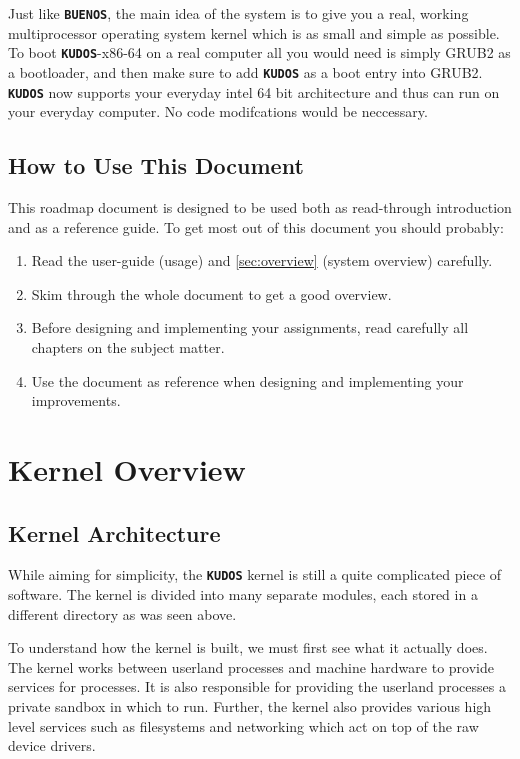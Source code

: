 \documentclass[twoside,a4paper]{report}
\newcommand{\buenos}{\texttt{\textbf{BUENOS}}}
\newcommand{\kudos}{\texttt{\textbf{KUDOS}}}
\begin{document}
Just like \buenos{}, the main idea of the system is to give you a real, working
multiprocessor operating system kernel which is as small and simple as
possible. To boot \kudos{}-x86-64 on a real computer all you would need is simply
GRUB2 as a bootloader, and then make sure to add \kudos{} as a boot
entry into GRUB2. \kudos{} now supports your everyday intel 64 bit
architecture and thus can run on your everyday computer. No code
modifcations would be neccessary. 


\section{How to Use This Document}

This roadmap document is designed to be used both as read-through
introduction and as a reference guide. To get most out of this
document you should probably:

\begin{enumerate}

\item Read the user-guide (usage) and \autoref{sec:overview}
(system overview) carefully.

\item Skim through the whole document to get a good overview.

\item Before designing and implementing your assignments, read
carefully all chapters on the subject matter.

\item Use the document as reference when designing and implementing
your improvements.

\end{enumerate}

\chapter{Kernel Overview}
\label{sec:overview}

\section{Kernel Architecture}

While aiming for simplicity, the \kudos{} kernel is still a quite
complicated piece of software. The kernel is divided into many
separate modules, each stored in a different directory as was
seen above.

To understand how the kernel is built, we must first see what it
actually does. The kernel works between userland processes and machine
hardware to provide services for processes. It is also responsible for
providing the userland processes a private sandbox in which to run. Further,
the kernel also provides various high level services such as
filesystems and networking which act on top of the raw device drivers.
\end{document}
